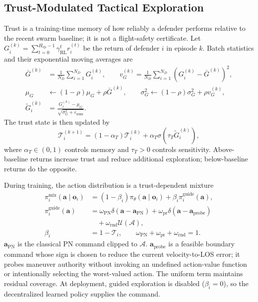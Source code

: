 \documentclass[lettersize,journal]{IEEEtran}
\begin{document}
\subsection{Trust-Modulated Tactical Exploration}
\label{subsec:trust_exploration}

Trust is a training-time memory of how reliably a defender performs relative to the recent
swarm baseline; it is not a flight-safety certificate. Let
$G_i^{(k)}=\sum_{t=0}^{H_{\mathrm{ep}}-1}\gamma_{\mathrm{RL}}^t r_i^{(t)}$ be the return
of defender $i$ in episode $k$. Batch statistics and their exponential moving averages are
\begin{equation}
\label{eq:trust_statistics}
\begin{aligned}
\bar G^{(k)}&=\frac{1}{N_D}\sum_{i=1}^{N_D}G_i^{(k)},\qquad
v_G^{(k)}=\frac{1}{N_D}\sum_{i=1}^{N_D}(G_i^{(k)}-\bar G^{(k)})^2,\\
\mu_G&\leftarrow(1-\rho)\mu_G+\rho\bar G^{(k)},\qquad
\sigma_G^2\leftarrow(1-\rho)\sigma_G^2+\rho v_G^{(k)},\\
\widetilde G_i^{(k)}&=\frac{G_i^{(k)}-\mu_G}
{\sqrt{\sigma_G^2+\varepsilon_{\mathrm{num}}}}.
\end{aligned}
\end{equation}
The trust state is then updated by
\begin{equation}
\label{eq:trust_update}
\mathcal T_i^{(k+1)}=(1-\alpha_T)\mathcal T_i^{(k)}
+\alpha_T\sigma(\tau_T\widetilde G_i^{(k)}),
\end{equation}
where $\alpha_T\in(0,1)$ controls memory and $\tau_T>0$ controls sensitivity. Above-baseline
returns increase trust and reduce additional exploration; below-baseline returns do the
opposite.

During training, the action distribution is a trust-dependent mixture
\begin{equation}
\label{eq:exploration_policy}
\begin{aligned}
\pi_i^{\mathrm{mix}}(\mathbf a\mid\mathbf o_i)
&=(1-\beta_i)\pi_{\theta}(\mathbf a\mid\mathbf o_i)
+\beta_i\pi_i^{\mathrm{guide}}(\mathbf a),\\
\pi_i^{\mathrm{guide}}(\mathbf a)&=
\omega_{\mathrm{PN}}\delta(\mathbf a-\mathbf a_{\mathrm{PN}})
+\omega_{\mathrm{pr}}\delta(\mathbf a-\mathbf a_{\mathrm{probe}})\\
&\quad+\omega_{\mathrm{rnd}}\mathcal U(\mathcal A),\\
\beta_i&=1-\mathcal T_i,\qquad
\omega_{\mathrm{PN}}+\omega_{\mathrm{pr}}+\omega_{\mathrm{rnd}}=1.
\end{aligned}
\end{equation}
$\mathbf a_{\mathrm{PN}}$ is the classical PN command clipped to $\mathcal A$.
$\mathbf a_{\mathrm{probe}}$ is a feasible boundary command whose sign is chosen to reduce the
current velocity-to-LOS error; it probes maneuver authority without invoking an undefined
action-value function or intentionally selecting the worst-valued action. The uniform term
maintains residual coverage. At deployment, guided exploration is disabled ($\beta_i=0$), so
the decentralized learned policy supplies the command.
\end{document}
